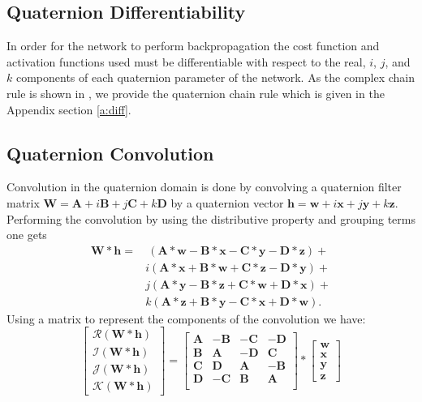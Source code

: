 \documentclass[conference]{IEEEtran}
\begin{document}
\subsection{Quaternion Differentiability}
In order for the network to perform backpropagation the cost function and activation functions used must be differentiable with respect to the real, $i$, $j$, and $k$ components of each quaternion parameter of the network.
As the complex chain rule is shown in \cite{trabelsi2017deep}, we provide the quaternion chain rule which is given in the Appendix section \ref{a:diff}.


\subsection{Quaternion Convolution}\label{s:qc}
Convolution in the quaternion domain is done by convolving a quaternion filter matrix $\textbf{W}=\textbf{A}+\textit{i}\textbf{B}+\textit{j}\textbf{C}+\textit{k}\textbf{D}$ by a quaternion vector $\textbf{h}=\textbf{w}+\textit{i}\textbf{x}+\textit{j}\textbf{y}+\textit{k}\textbf{z}$. 
Performing the convolution by using the distributive property and grouping terms one gets
\begin{align}
\textbf{W}\ast \textbf{h} = &~(\textbf{A}\ast\textbf{w}-\textbf{B}\ast\textbf{x}-\textbf{C}\ast\textbf{y}-\textbf{D}\ast\textbf{z}) + \nonumber \\ 
&\textit{i}(\textbf{A}\ast\textbf{x}+\textbf{B}\ast\textbf{w}+\textbf{C}\ast\textbf{z}-\textbf{D}\ast\textbf{y}) + \nonumber \\
&\textit{j}(\textbf{A}\ast\textbf{y}-\textbf{B}\ast\textbf{z}+\textbf{C}\ast\textbf{w}+\textbf{D}\ast\textbf{x}) + \nonumber \\
&\textit{k}(\textbf{A}\ast\textbf{z}+\textbf{B}\ast\textbf{y}-\textbf{C}\ast\textbf{x}+\textbf{D}\ast\textbf{w}).
\label{eq:convolve1}
\end{align}
Using a matrix to represent the components of the convolution we have:
\begin{equation}
\begin{bmatrix}
 \mathscr{R}(\textbf{W}\ast \textbf{h}) \\ 
 \mathscr{I}(\textbf{W}\ast \textbf{h}) \\
 \mathscr{J}(\textbf{W}\ast \textbf{h}) \\
 \mathscr{K}(\textbf{W}\ast \textbf{h}) 
\end{bmatrix}
=
\begin{bmatrix}
 \textbf{A} & -\textbf{B} & -\textbf{C} & -\textbf{D}\\
 \textbf{B} & \textbf{A} & -\textbf{D} & \textbf{C} \\
 \textbf{C} & \textbf{D} & \textbf{A} & -\textbf{B} \\
 \textbf{D} & -\textbf{C} & \textbf{B} & \textbf{A} \\
\end{bmatrix}
\ast
\begin{bmatrix}
 \textbf{w} \\ 
 \textbf{x} \\
 \textbf{y} \\
 \textbf{z}
\end{bmatrix}
\label{eq:}
\end{equation}
\end{document}
